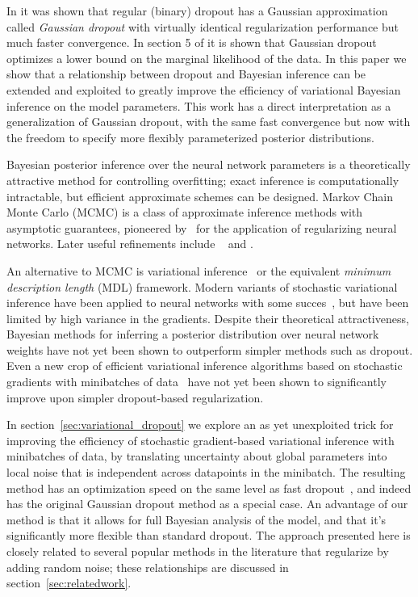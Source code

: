  In \cite{wang2013fast} it was shown that regular (binary) dropout has a Gaussian approximation called \emph{Gaussian dropout} with virtually identical regularization performance but much faster convergence. In section 5 of \cite{wang2013fast} it is shown that Gaussian dropout optimizes a lower bound on the marginal likelihood of the data. In this paper we show that a relationship between dropout and Bayesian inference can be extended and exploited to greatly improve the efficiency of variational Bayesian inference on the model parameters. This work has a direct interpretation as a generalization of Gaussian dropout, with the same fast convergence but now with the freedom to specify more flexibly parameterized posterior distributions.

Bayesian posterior inference over the neural network parameters is a theoretically attractive method for controlling overfitting; exact inference is computationally intractable, but efficient approximate schemes can be designed. Markov Chain Monte Carlo (MCMC) is a class of approximate inference methods with asymptotic guarantees, pioneered by~\cite{neal1995bayesian} for the application of regularizing neural networks. Later useful refinements include ~\cite{welling2011bayesian} and \cite{ahn2012bayesian}.

An alternative to MCMC is variational inference~\cite{hinton1993keeping} or the equivalent \emph{minimum description length} (MDL) framework. Modern variants of stochastic variational inference have been applied to neural networks with some succes~\cite{graves2011practical}, but have been limited by high variance in the gradients. Despite their theoretical attractiveness, Bayesian methods for inferring a posterior distribution over neural network weights have not yet been shown to outperform simpler methods such as dropout. Even a new crop of efficient variational inference algorithms based on stochastic gradients with minibatches of data~\cite{salimans2013fixedform,kingma2013auto,rezende2014stochastic} have not yet been shown to significantly improve upon simpler dropout-based regularization.

In section~\ref{sec:variational_dropout} we explore an as yet unexploited trick for improving the efficiency of stochastic gradient-based variational inference with minibatches of data, by translating uncertainty about global parameters into local noise that is independent across datapoints in the minibatch. The resulting method has an optimization speed on the same level as fast dropout~\cite{wang2013fast}, and indeed has the original Gaussian dropout method as a special case. An advantage of our method is that it allows for full Bayesian analysis of the model, and that it's significantly more flexible than standard dropout. The approach presented here is closely related to several popular methods in the literature that regularize by adding random noise; these relationships are discussed in section~\ref{sec:relatedwork}.



